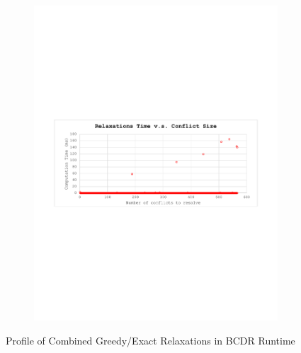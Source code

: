 \documentclass[jair,twoside,11pt,theapa]{article}
\begin{document}
\begin{figure}[!ht]
\begin{subfigure}[b]{0.8\textwidth}
		\includegraphics[width=\textwidth,trim={2.6cm 10.2cm 2.4cm 10.3cm},clip]{figures/BunchConflict/relaxation_time_400bunch.pdf}
		\caption{}
		\label{fig:cont_relaxation_time_improved}
	\end{subfigure}
	\caption{Profile of Combined Greedy/Exact Relaxations in BCDR Runtime}
	\label{fig:conflict_resolution_time_improved}
\end{figure}
\end{document}
